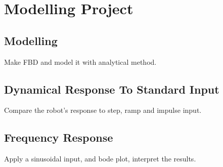 \documentclass[11pt]{report}
\begin{document}
\chapter{Modelling Project}
\label{sec:org5c4aff1}
\section{Modelling}
\label{sec:orgc67ddac}
Make FBD and model it with analytical method.
\section{Dynamical Response To Standard Input}
\label{sec:org53e3530}
Compare the robot's response to step, ramp and impulse input.
\section{Frequency Response}
\label{sec:orgd1aa60e}
Apply a sinusoidal input, and bode plot, interpret the results.
\end{document}
